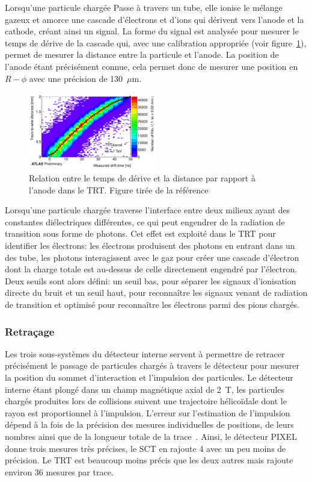 Lorsqu'une particule chargée Passe à travers un tube, elle ionise le
mélange gazeux et amorce une cascade d'électrons et d'ions qui
dérivent vers l'anode et la cathode, créant ainsi un signal. La forme
du signal est analysée pour mesurer le temps de dérive de la cascade
qui, avec une calibration appropriée (voir figure~\ref{fig:trt}),
permet de mesurer la distance entre la particule et l'anode. La
position de l'anode étant précisément connue, cela permet donc de
mesurer une position en $R-\phi$ avec une précision de 130~$\mu$m.

\begin{figure}[h]
  \centering
  \includegraphics[width=0.5\textwidth]{trt.pdf}
  \caption{Relation entre le temps de dérive et la distance par
    rapport à l'anode dans le TRT. Figure tirée de la
    référence~\cite{ATLAS-CONF-2011-006}}
  \label{fig:trt}
\end{figure}

Lorsqu'une particule chargée traverse l'interface entre deux milieux
ayant des constantes diélectriques différentes, ce qui peut engendrer
de la radiation de transition sous forme de photons. Cet effet est
exploité dans le TRT pour identifier les électrons: les électrons
produisent des photons en entrant dans un des tube, les photons
interagissent avec le gaz pour créer une cascade d'électron dont la
charge totale est au-dessus de celle directement engendré par
l'électron. Deux seuils sont alors défini: un seuil bas, pour séparer
les signaux d'ionisation directe du bruit et un seuil haut, pour
reconnaître les signaux venant de radiation de transition et optimisé
pour reconnaître les électrons parmi des pions chargés.

\subsubsection{Retraçage}

Les trois sous-systèmes du détecteur interne servent à permettre de
retracer précisément le passage de particules chargés à travers le
détecteur pour mesurer la position du sommet d'interaction et
l'impulsion des particules. Le détecteur interne étant plongé dans un
champ magnétique axial de 2~T, les particules chargés produites lors
de collisions suivent une trajectoire hélicoïdale dont le rayon est
proportionnel à l'impulsion. L'erreur sur l'estimation de l'impulsion
dépend à la fois de la précision des mesures individuelles de
positions, de leurs nombres ainsi que de la longueur totale de la
trace~\cite{olive_detectors_2014}. Ainsi, le détecteur PIXEL donne
trois mesures très précises, le SCT en rajoute 4 avec un peu moins de
précision. Le TRT est beaucoup moins précis que les deux autres mais
rajoute environ 36 mesures par trace.

